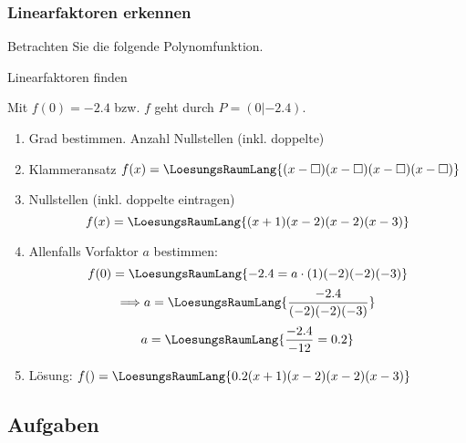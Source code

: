 \subsubsection{Linearfaktoren erkennen}
Betrachten Sie die folgende Polynomfunktion.


\begin{rezept}{Linearfaktoren finden}{}


  Mit $f(0) = -2.4$ bzw. $f$ geht durch $P=(0|-2.4)$.
    
    \begin{enumerate}
  \item Grad bestimmen. Anzahl Nullstellen (inkl. doppelte) 
  \item Klammeransatz $f(x) =
    \LoesungsRaumLang{(x-\Box)(x-\Box)(x-\Box)(x-\Box)}$
  \item Nullstellen (inkl. doppelte eintragen)
    $$f(x) = \LoesungsRaumLang{(x+1)(x-2)(x-2)(x-3)}$$
  \item Allenfalls Vorfaktor $a$ bestimmen:
    $$f(0) = \LoesungsRaumLang{-2.4 = a \cdot{}(1)(-2)(-2)(-3)}$$
    $$\Longrightarrow a= \LoesungsRaumLang{\frac{-2.4}{(-2)(-2)(-3)}}$$
    $$a  = \LoesungsRaumLang{\frac{-2.4}{-12} = 0.2}$$

  \item Lösung: $f() = \LoesungsRaumLang{0.2 (x+1)(x-2)(x-2)(x-3)}$ 
    \end{enumerate}
  
  \end{rezept}

\subsection*{Aufgaben}



\newpage


